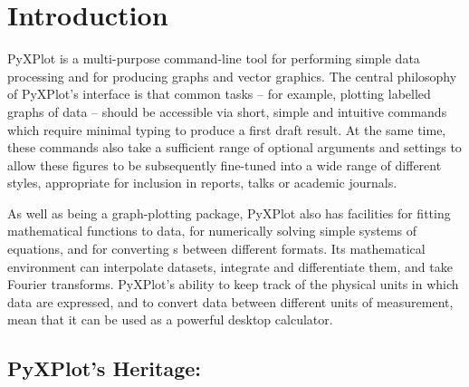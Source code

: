 %
%
%
%
%



\chapter{Introduction}

\label{ch:introduction}

{\sc PyXPlot} is a multi-purpose command-line tool for performing simple data
processing and for producing graphs and vector graphics. The central philosophy
of PyXPlot's interface is that common tasks -- for example, plotting labelled
graphs of data -- should be accessible via short, simple and intuitive commands
which require minimal typing to produce a first draft result.  At the same
time, these commands also take a sufficient range of optional arguments and
settings to allow these figures to be subsequently fine-tuned into a wide range
of different styles, appropriate for inclusion in reports, talks or academic
journals.

As well as being a graph-plotting package, PyXPlot also has facilities for
fitting mathematical functions to data, for numerically solving simple systems
of equations, and for converting \datafile s between different formats.  Its
mathematical environment can interpolate datasets, integrate and differentiate
them, and take Fourier transforms.  PyXPlot's ability to keep track of the
physical units in which data are expressed, and to convert data between
different units of measurement, mean that it can be used as a powerful desktop
calculator.

\section{PyXPlot's Heritage: \gnuplot}

